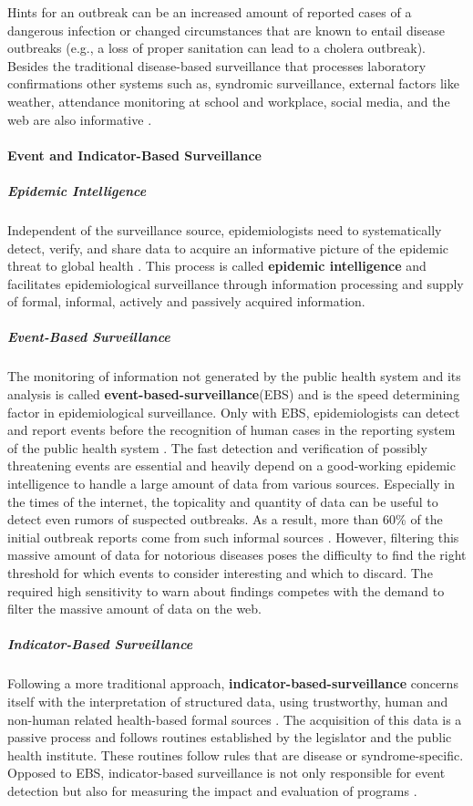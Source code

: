 Hints for an outbreak can be an increased amount of reported cases of a dangerous infection or changed circumstances that are known to entail disease outbreaks (e.g., a loss of proper sanitation can lead to a cholera outbreak).
Besides the traditional disease-based surveillance that processes laboratory confirmations other systems such as, syndromic surveillance, external factors like weather, attendance monitoring at school and workplace, social media, and the web are also informative \citep{EarlyDetection}.

\paragraph{Event and Indicator-Based Surveillance}

\subparagraph{Epidemic Intelligence}
Independent of the surveillance source, epidemiologists need to systematically detect, verify, and share data to acquire an informative picture of the epidemic threat to global health \citep{EarlyDetection}.
This process is called \textbf{epidemic intelligence} and facilitates epidemiological surveillance through information processing and supply of formal, informal, actively and passively acquired information.


\subparagraph{Event-Based Surveillance}
The monitoring of information not generated by the public health system and its analysis is called \textbf{event-based-surveillance}(\gls{EBS}) and is the speed determining factor in epidemiological surveillance.
Only with EBS, epidemiologists can detect and report events before the recognition of human cases in the reporting system of the public health system \citep{EarlyDetection}.
The fast detection and verification of possibly threatening events are essential and heavily depend on a good-working epidemic intelligence to handle a large amount of data from various sources.
Especially in the times of the internet, the topicality and quantity of data can be useful to detect even rumors of suspected outbreaks.
As a result, more than 60\% of the initial outbreak reports come from such informal sources \citep{EpiSurv}.
However, filtering this massive amount of data for notorious diseases poses the difficulty to find the right threshold for which events to consider interesting and which to discard.
The required high sensitivity to warn about findings competes with the demand to filter the massive amount of data on the web.

\subparagraph{Indicator-Based Surveillance}
Following a more traditional approach, \textbf{indicator-based-surveillance} concerns itself with the interpretation of structured data, using trustworthy, human and non-human related health-based formal sources \citep{EarlyDetection}.
The acquisition of this data is a passive process and follows routines established by the legislator and the public health institute.
These routines follow rules that are disease or syndrome-specific.
Opposed to EBS, indicator-based surveillance is not only responsible for event detection but also for measuring the impact and evaluation of programs \citep{EarlyDetection}.

